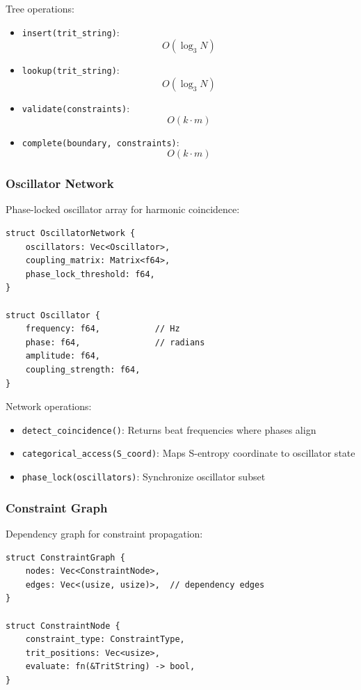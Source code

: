 \documentclass[11pt,twocolumn,a4paper]{article}
\theoremstyle{remark}
\begin{document}
Tree operations:
\begin{itemize}
\item \texttt{insert(trit\_string)}: $$O(\log_3 N)$$
\item \texttt{lookup(trit\_string)}: $$O(\log_3 N)$$
\item \texttt{validate(constraints)}: $$O(k \cdot m)$$
\item \texttt{complete(boundary, constraints)}: $$O(k \cdot m)$$
\end{itemize}

\subsubsection{Oscillator Network}

Phase-locked oscillator array for harmonic coincidence:

\begin{verbatim}
struct OscillatorNetwork {
    oscillators: Vec<Oscillator>,
    coupling_matrix: Matrix<f64>,
    phase_lock_threshold: f64,
}

struct Oscillator {
    frequency: f64,           // Hz
    phase: f64,               // radians
    amplitude: f64,
    coupling_strength: f64,
}
\end{verbatim}

Network operations:
\begin{itemize}
\item \texttt{detect\_coincidence()}: Returns beat frequencies where phases align
\item \texttt{categorical\_access(S\_coord)}: Maps S-entropy coordinate to oscillator state
\item \texttt{phase\_lock(oscillators)}: Synchronize oscillator subset
\end{itemize}

\subsubsection{Constraint Graph}

Dependency graph for constraint propagation:

\begin{verbatim}
struct ConstraintGraph {
    nodes: Vec<ConstraintNode>,
    edges: Vec<(usize, usize)>,  // dependency edges
}

struct ConstraintNode {
    constraint_type: ConstraintType,
    trit_positions: Vec<usize>,
    evaluate: fn(&TritString) -> bool,
}
\end{verbatim}
\end{document}
